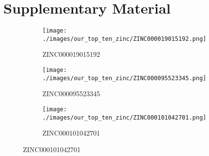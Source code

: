 \documentclass[11pt, letterpaper, titlepage]{article}
\begin{document}
\section{Supplementary Material}
\begin{figure}[h!]
     \centering
     \begin{adjustbox}{minipage=\linewidth,scale=1}
     \begin{subfigure}[b]{0.3\textwidth}
         \centering
         \texttt{[image: ./images/our\_top\_ten\_zinc/ZINC000019015192.png]}
         \caption{ZINC000019015192}
         \label{fig:ZINC000019015192}
     \end{subfigure}
     \hfill
     \begin{subfigure}[b]{0.3\textwidth}
         \centering
         \texttt{[image: ./images/our\_top\_ten\_zinc/ZINC000095523345.png]}
         \caption{ZINC000095523345}
         \label{fig:ZINC000095523345}
     \end{subfigure}
     \hfill
     \begin{subfigure}[b]{0.3\textwidth}
         \centering
         \texttt{[image: ./images/our\_top\_ten\_zinc/ZINC000101042701.png]}
         \caption{ZINC000101042701}
         \label{fig:ZINC000101042701}
     \end{subfigure}


\end{adjustbox}
\end{figure}
\end{document}
